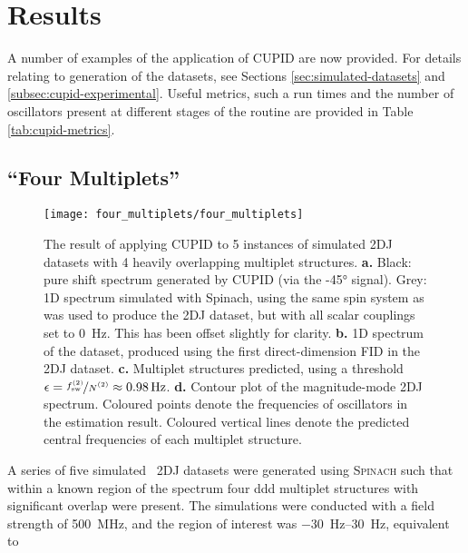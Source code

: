\section{Results}
\label{subsec:cupid-results}
A number of examples of the application of \ac{CUPID} are now provided.
For details relating to generation of the datasets, see Sections
\ref{sec:simulated-datasets} and \ref{subsec:cupid-experimental}. Useful
metrics, such a run times and the number of oscillators present at different
stages of the routine are provided in Table \ref{tab:cupid-metrics}.

\subsection{``Four Multiplets''}
\label{subsec:four-mp}
\begin{figure}
    \centering
    \texttt{[image: four\_multiplets/four\_multiplets]}
    \caption[
        The result of applying \acs{CUPID} to 5 instances of simulated
        \acs{2DJ} datasets with 4 heavily overlapping multiplet structures.
    ]{
        The result of applying \ac{CUPID} to 5 instances of simulated \ac{2DJ}
        datasets with 4 heavily overlapping multiplet structures.
        \textbf{a.} Black: pure shift spectrum generated by \ac{CUPID} (via the
        \ang{-45} signal).
        Grey: \ac{1D} spectrum simulated with Spinach, using the same spin
        system as was used to produce the \ac{2DJ} dataset, but with all scalar
        couplings set to \qty{0}{\hertz}. This has been offset slightly for
        clarity.
        \textbf{b.} \ac{1D} spectrum of the dataset, produced using the first
        direct-dimension \ac{FID} in the \ac{2DJ} dataset.
        \textbf{c.} Multiplet structures predicted, using a threshold $\epsilon
        = \nicefrac{\fswtwo}{\Ntwo} \approx \qty{0.98}{\hertz}$.
        \textbf{d.} Contour plot of the magnitude-mode \ac{2DJ} spectrum.
        Coloured points denote the frequencies of oscillators in the
        estimation result. Coloured vertical lines denote the predicted central
        frequencies of each multiplet structure.
    }
    \label{fig:four-multiplets}
\end{figure}
A series of five simulated \proton\ \ac{2DJ} datasets
were generated using \textsc{Spinach} such that within a
known region of the spectrum four ddd multiplet structures with significant
overlap were present. The simulations were conducted with a field strength of
\qty{500}{\mega\hertz}, and the region of interest was
\SIrange{-30}{30}{\hertz}, equivalent to
